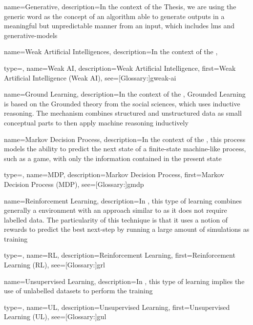 {
  name={Generative},
  description={In the context of the Thesis, we are using the generic word  as the concept of an algorithm able to generate outputs in a meaningful but unpredictable manner from an input, which includes \glspl{lm} and \glspl{generative-model}}
}

{
  name={Weak Artificial Intelligences},
  description={In the context of the , }
}

{
  type=\acronymtype,
  name={Weak AI},
  description={Weak Artificial Intelligence},
  first={Weak Artificial Intelligence (Weak AI)},
  see=[Glossary:]{gweak-ai}
}

{
  name={Ground Learning},
  description={In the context of the , Grounded Learning is based on the Grounded theory from the social sciences, which uses inductive reasoning. The mechanism combines structured and unstructured data as small conceptual parts to then apply machine reasoning inductively}
}


{
  name={Markov Decision Process},
  description={In the context of the , this process models the ability to predict the next state of a finite-state machine-like process, such as a game, with only the information contained in the present state}
}

{
  type=\acronymtype,
  name={MDP},
  description={Markov Decision Process},
  first={Markov Decision Process (MDP)},
  see=[Glossary:]{gmdp}
}

{
  name={Reinforcement Learning},
  description={In , this type of learning combines generally a  environment with an approach similar to  as it does not require labelled data. The particularity of this technique is that it uses a notion of rewards to predict the best next-step by running a large amount of simulations as training}
}

{
  type=\acronymtype,
  name={RL},
  description={Reinforcement Learning},
  first={Reinforcement Learning (RL)},
  see=[Glossary:]{grl}
}

{
  name={Unsupervised Learning},
  description={In , this type of learning implies the use of unlabelled datasets to perform the training}
}

{
  type=\acronymtype,
  name={UL},
  description={Unsupervised Learning},
  first={Unsupervised Learning (UL)},
  see=[Glossary:]{gul}
}

